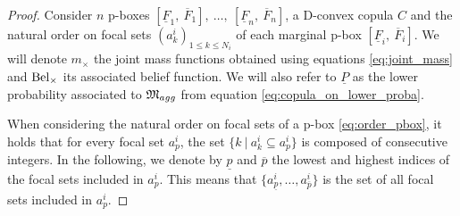 \begin{proof}
    Consider $n$ p-boxes $[\underline{F}_1,~\overline{F}_1],~\dots,~[\underline{F}_n,~\overline{F}_n]$, a D-convex copula $C$ and the natural order on focal sets $(a^i_k)_{1\leqslant k \leqslant N_i}$ of each marginal p-box $[\underline{F}_i,~\overline{F}_i]$. We will denote $m_\times$ the joint mass functions obtained using equations \eqref{eq:joint_mass} and ${\mathrm{Bel}}_\times$ its associated belief function. We will also refer to $\underline{P}$ as the lower probability associated to ${\mathfrak{M}}_{agg}$ from equation \eqref{eq:copula_on_lower_proba}.

    When considering the natural order on focal sets of a p-box \eqref{eq:order_pbox}, it holds that for every focal set $a^i_p$, the set $\{k~|~a^i_k\subseteq a^i_p\}$ is composed of consecutive integers. In the following, we denote by $\underline{p}$ and $\overline{p}$ the lowest and highest indices of the focal sets included in $a^i_p$. This means that $\{a^i_{\underline{p}}, \dots, a^i_{\overline{p}}\}$ is the set of all focal sets included in $a^i_p$. 


\end{proof}
